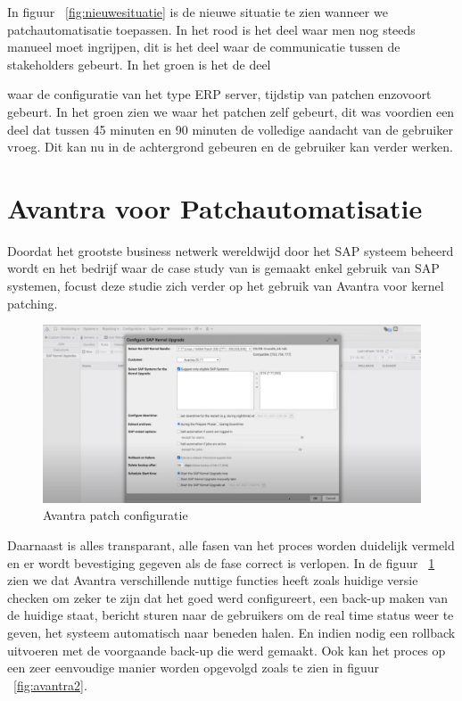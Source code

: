 In figuur ~\ref{fig:nieuwesituatie} is de nieuwe situatie te zien wanneer we patchautomatisatie toepassen. In het rood is het deel waar men nog steeds manueel moet ingrijpen, dit is het deel waar de communicatie tussen de stakeholders gebeurt. In het groen is het de deel 

waar de configuratie van het type ERP server, tijdstip van patchen enzovoort gebeurt. In het groen zien we waar het patchen zelf gebeurt, dit was voordien een deel dat tussen 45 minuten en 90 minuten de volledige aandacht van de gebruiker vroeg. Dit kan nu in de achtergrond gebeuren en de gebruiker kan verder werken. \\


\section{Avantra voor Patchautomatisatie}
Doordat het grootste business netwerk wereldwijd door het SAP systeem beheerd wordt \autocite{Laborde2024} en het bedrijf waar de case study van is gemaakt enkel gebruik van SAP systemen, focust deze studie zich verder op het gebruik van Avantra voor kernel patching.

\begin{figure}[h]
    \centering
    \includegraphics[width=\textwidth]{avantra1.png}
    \caption{Avantra patch configuratie}
     \label{fig:avantra1}
\end{figure}
\newpage


Daarnaast is alles transparant, alle fasen van het proces worden duidelijk vermeld en er wordt bevestiging gegeven als de fase correct is verlopen. In de figuur ~\ref{fig:avantra1} zien we dat Avantra verschillende
nuttige functies heeft zoals huidige versie checken om zeker te zijn dat het goed werd configureert, een back-up maken van de huidige staat, bericht sturen naar de gebruikers om de real time status weer
   te geven, het systeem automatisch naar beneden halen. En indien nodig een rollback uitvoeren met de voorgaande back-up die werd gemaakt. Ook kan het proces op een zeer eenvoudige manier worden opgevolgd zoals te zien in figuur ~\ref{fig:avantra2}.\\

